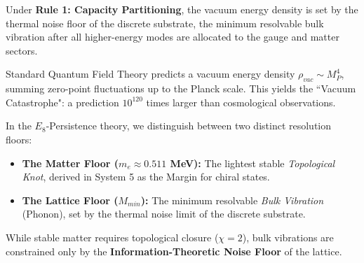 Under \textbf{Rule 1: Capacity Partitioning}, the vacuum energy density is set by the thermal noise floor of the discrete substrate, the minimum resolvable bulk vibration after all higher-energy modes are allocated to the gauge and matter sectors.

Standard Quantum Field Theory predicts a vacuum energy density $\rho_{vac} \sim M_P^4$, summing zero-point fluctuations up to the Planck scale. This yields the ``Vacuum Catastrophe": a prediction $10^{120}$ times larger than cosmological observations.

In the $E_8$-Persistence theory, we distinguish between two distinct resolution floors:
\begin{itemize}
    \item \textbf{The Matter Floor ($m_e \approx 0.511$ MeV):} The lightest stable \emph{Topological Knot}, derived in System 5 as the Margin for chiral states.
    \item \textbf{The Lattice Floor ($M_{min}$):} The minimum resolvable \emph{Bulk Vibration} (Phonon), set by the thermal noise limit of the discrete substrate.
\end{itemize}

While stable matter requires topological closure ($\chi = 2$), bulk vibrations are constrained only by the \textbf{Information-Theoretic Noise Floor} of the lattice.

